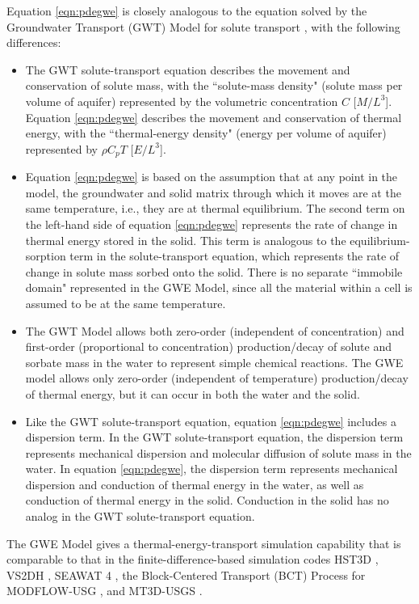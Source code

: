 Equation \ref{eqn:pdegwe} is closely analogous to the equation solved by the Groundwater Transport (GWT) Model for solute transport \citep{modflow6gwt}, with the following differences:

\begin{itemize}
\item The GWT solute-transport equation describes the movement and conservation of solute mass, with the ``solute-mass density" (solute mass per volume of aquifer) represented by the volumetric concentration $C$ [$M/L^3$]. Equation \ref{eqn:pdegwe} describes the movement and conservation of thermal energy, with the ``thermal-energy density" (energy per volume of aquifer) represented by $\rho C_{p} T$ [$E/L^3$].
\item Equation \ref{eqn:pdegwe} is based on the assumption that at any point in the model, the groundwater and solid matrix through which it moves are at the same temperature, i.e., they are at thermal equilibrium. The second term on the left-hand side of equation \ref{eqn:pdegwe} represents the rate of change in thermal energy stored in the solid. This term is analogous to the equilibrium-sorption term in the solute-transport equation, which represents the rate of change in solute mass sorbed onto the solid. There is no separate ``immobile domain" represented in the GWE Model, since all the material within a cell is assumed to be at the same temperature.
\item The GWT Model allows both zero-order (independent of concentration) and first-order (proportional to concentration) production/decay of solute and sorbate mass in the water to represent simple chemical reactions. The GWE model allows only zero-order (independent of temperature) production/decay of thermal energy, but it can occur in both the water and the solid.
\item Like the GWT solute-transport equation, equation \ref{eqn:pdegwe} includes a dispersion term. In the GWT solute-transport equation, the dispersion term represents mechanical dispersion and molecular diffusion of solute mass in the water. In equation \ref{eqn:pdegwe}, the dispersion term represents mechanical dispersion and conduction of thermal energy in the water, as well as conduction of thermal energy in the solid. Conduction in the solid has no analog in the GWT solute-transport equation.
\end{itemize}

\noindent The GWE Model gives \mf a thermal-energy-transport simulation capability that is comparable to that in the finite-difference-based simulation codes HST3D \citep{kipp1987}, VS2DH \citep{healy1996}, SEAWAT 4 \citep{langevin2008seawat}, the Block-Centered Transport (BCT) Process for MODFLOW-USG \citep{modflowusg, panday2019bct}, and MT3D-USGS \citep{mt3dusgs}.

